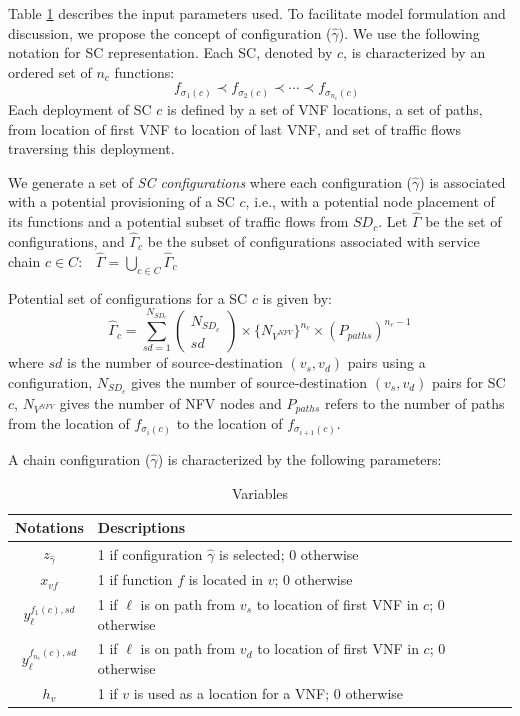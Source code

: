 \documentclass[12pt]{article}
\begin{document}
Table \ref{table:3} describes the input parameters used. To facilitate model formulation and discussion, we propose the concept of configuration ($\hat{\gamma}$). We use the following notation for SC representation. Each SC, denoted by $c$, is characterized by an ordered set of $n_c$ functions:
\begin{equation}
[\textrm{SC}\ c]\quad f_{\sigma_1 (c)}\prec f_{\sigma_2 (c)}\prec \cdots \prec f_{\sigma_{n_c} (c)}
\end{equation}
Each deployment of SC $c$ is defined by a set of VNF locations, a set of paths, from location of first VNF to location of last VNF, and set of traffic flows traversing this deployment.

We generate a set of \emph{SC configurations} where each configuration ($\hat{\gamma}$) is associated with a potential provisioning of a SC $c$, i.e., with a potential node placement of its functions and a potential subset of traffic flows from $SD_c$. Let $\hat{\Gamma}$ be the set of configurations, and $\hat{\Gamma}_c$ be the subset of configurations associated with service chain $c\in C$:\ \   $\hat{\Gamma}=\bigcup_{c\in C} \hat{\Gamma}_c$

Potential set of configurations for a SC $c$ is given by:
\begin{equation}
\hat{\Gamma}_c=\sum_{sd=1}^{N_{SD_c}} \left(
    \begin{array}{c}
      N_{SD_c} \\
      sd
    \end{array}
  \right)
\times \{ N_{V^{NFV}} \}^{n_c}
\times  (P_{paths})^{n_c -1}
\end{equation}
where $sd$ is the number of source-destination $(v_s, v_d)$ pairs using a configuration, $N_{SD_c}$ gives the number of source-destination $(v_s, v_d)$ pairs for SC $c$, $N_{V ^{NFV}}$ gives the number of NFV nodes and $P_{paths}$ refers to the number of paths from the location of $f_{\sigma_i (c)}$ to the location of $f_{\sigma_{i+1} (c)}$.

A chain configuration ($\hat{\gamma}$) is characterized by the following parameters:
\begin{table}[t!]
\centering
\begin{tabular}{|c l|} 
 \hline
 Notations & Descriptions \\ [0.5ex] 
 \hline
 $z_{\hat{\gamma}}$ & 1 if configuration $\hat{\gamma}$ is selected; 0 otherwise\\ 
 $x_{vf}$ & 1 if function $f$ is located in $v$; 0 otherwise \\
 $y_{\ell}^{f_1 (c),sd}$ & 1 if $\ell$ is on path from $v_s$ to location of first VNF in $c$; 0 otherwise \\
 $y_{\ell}^{f_{n_c} (c),sd}$& 1 if $\ell$ is on path from $v_d$ to location of first VNF in $c$; 0 otherwise\\
 $h_v$&1 if $v$ is used as a location for a VNF; 0 otherwise\\[1ex] 
 \hline
\end{tabular}
\caption{Variables}
\label{table:3}
\end{table}
\end{document}
